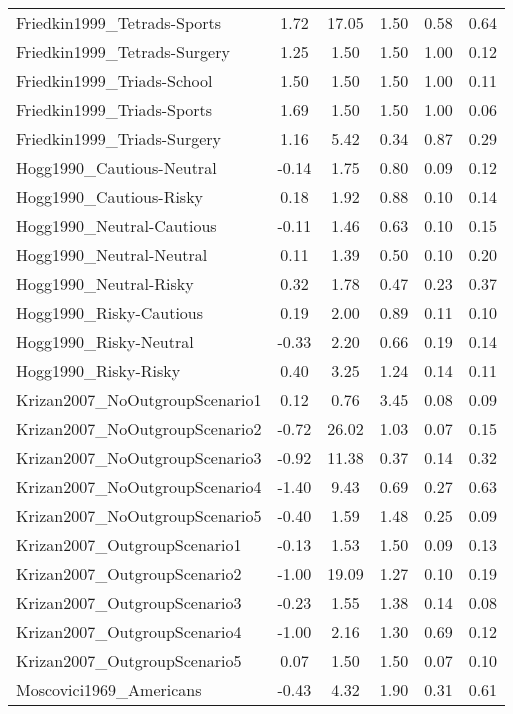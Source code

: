 \begin{longtable}{lccccc}
Friedkin1999\_Tetrads-Sports & 1.72 & 17.05 & 1.50 & 0.58 & 0.64\\
\addlinespace
Friedkin1999\_Tetrads-Surgery & 1.25 & 1.50 & 1.50 & 1.00 & 0.12\\
Friedkin1999\_Triads-School & 1.50 & 1.50 & 1.50 & 1.00 & 0.11\\
Friedkin1999\_Triads-Sports & 1.69 & 1.50 & 1.50 & 1.00 & 0.06\\
Friedkin1999\_Triads-Surgery & 1.16 & 5.42 & 0.34 & 0.87 & 0.29\\
Hogg1990\_Cautious-Neutral & -0.14 & 1.75 & 0.80 & 0.09 & 0.12\\
\addlinespace
Hogg1990\_Cautious-Risky & 0.18 & 1.92 & 0.88 & 0.10 & 0.14\\
Hogg1990\_Neutral-Cautious & -0.11 & 1.46 & 0.63 & 0.10 & 0.15\\
Hogg1990\_Neutral-Neutral & 0.11 & 1.39 & 0.50 & 0.10 & 0.20\\
Hogg1990\_Neutral-Risky & 0.32 & 1.78 & 0.47 & 0.23 & 0.37\\
Hogg1990\_Risky-Cautious & 0.19 & 2.00 & 0.89 & 0.11 & 0.10\\
\addlinespace
Hogg1990\_Risky-Neutral & -0.33 & 2.20 & 0.66 & 0.19 & 0.14\\
Hogg1990\_Risky-Risky & 0.40 & 3.25 & 1.24 & 0.14 & 0.11\\
Krizan2007\_NoOutgroupScenario1 & 0.12 & 0.76 & 3.45 & 0.08 & 0.09\\
Krizan2007\_NoOutgroupScenario2 & -0.72 & 26.02 & 1.03 & 0.07 & 0.15\\
Krizan2007\_NoOutgroupScenario3 & -0.92 & 11.38 & 0.37 & 0.14 & 0.32\\
\addlinespace
Krizan2007\_NoOutgroupScenario4 & -1.40 & 9.43 & 0.69 & 0.27 & 0.63\\
Krizan2007\_NoOutgroupScenario5 & -0.40 & 1.59 & 1.48 & 0.25 & 0.09\\
Krizan2007\_OutgroupScenario1 & -0.13 & 1.53 & 1.50 & 0.09 & 0.13\\
Krizan2007\_OutgroupScenario2 & -1.00 & 19.09 & 1.27 & 0.10 & 0.19\\
Krizan2007\_OutgroupScenario3 & -0.23 & 1.55 & 1.38 & 0.14 & 0.08\\
\addlinespace
Krizan2007\_OutgroupScenario4 & -1.00 & 2.16 & 1.30 & 0.69 & 0.12\\
Krizan2007\_OutgroupScenario5 & 0.07 & 1.50 & 1.50 & 0.07 & 0.10\\
Moscovici1969\_Americans & -0.43 & 4.32 & 1.90 & 0.31 & 0.61\\

\end{longtable}
